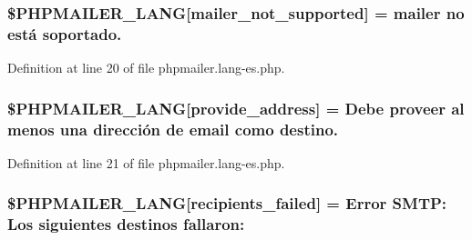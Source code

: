 \subsubsection[{\texorpdfstring{\$\+P\+H\+P\+M\+A\+I\+L\+E\+R\+\_\+\+L\+A\+NG}{$PHPMAILER_LANG}}]{\setlength{\rightskip}{0pt plus 5cm}\$P\+H\+P\+M\+A\+I\+L\+E\+R\+\_\+\+L\+A\+NG\mbox{[}\textquotesingle{}mailer\+\_\+not\+\_\+supported\textquotesingle{}\mbox{]} = \textquotesingle{} mailer no está soportado.\textquotesingle{}}\hypertarget{phpmailer_8lang-es_8php_aa2ebcb8833ee83a7ad67401c4bb3a6ad}{}\label{phpmailer_8lang-es_8php_aa2ebcb8833ee83a7ad67401c4bb3a6ad}


Definition at line 20 of file phpmailer.\+lang-\/es.\+php.

\subsubsection[{\texorpdfstring{\$\+P\+H\+P\+M\+A\+I\+L\+E\+R\+\_\+\+L\+A\+NG}{$PHPMAILER_LANG}}]{\setlength{\rightskip}{0pt plus 5cm}\$P\+H\+P\+M\+A\+I\+L\+E\+R\+\_\+\+L\+A\+NG\mbox{[}\textquotesingle{}provide\+\_\+address\textquotesingle{}\mbox{]} = \textquotesingle{}Debe proveer al menos una dirección de {\bf email} como destino.\textquotesingle{}}\hypertarget{phpmailer_8lang-es_8php_a8b97897c2406b7392b056f375feeefbb}{}\label{phpmailer_8lang-es_8php_a8b97897c2406b7392b056f375feeefbb}


Definition at line 21 of file phpmailer.\+lang-\/es.\+php.

\subsubsection[{\texorpdfstring{\$\+P\+H\+P\+M\+A\+I\+L\+E\+R\+\_\+\+L\+A\+NG}{$PHPMAILER_LANG}}]{\setlength{\rightskip}{0pt plus 5cm}\$P\+H\+P\+M\+A\+I\+L\+E\+R\+\_\+\+L\+A\+NG\mbox{[}\textquotesingle{}recipients\+\_\+failed\textquotesingle{}\mbox{]} = \textquotesingle{}Error S\+M\+T\+P\+: Los siguientes destinos fallaron\+: \textquotesingle{}}\hypertarget{phpmailer_8lang-es_8php_a7589d30bb9b368327c2df015f3e6bcba}{}\label{phpmailer_8lang-es_8php_a7589d30bb9b368327c2df015f3e6bcba}


